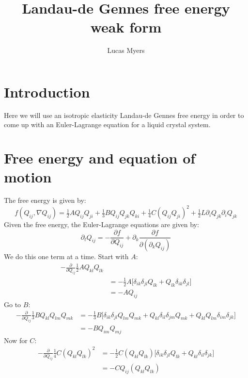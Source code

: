 \documentclass[reqno]{article}
\begin{document}
	\title{Landau-de Gennes free energy weak form}
	\author{Lucas Myers}
	\maketitle
	
	\section{Introduction}
	Here we will use an isotropic elasticity Landau-de Gennes free energy in order to come up with an Euler-Lagrange equation for a liquid crystal system.
	
	\section{Free energy and equation of motion}
	The free energy is given by:
	\begin{equation}
		f(Q_{ij}, \nabla Q_{ij})
		= \tfrac12 A Q_{ij} Q_{ji}
		+ \tfrac13 B Q_{ij} Q_{jk} Q_{ki}
		+ \tfrac14 C (Q_{ij} Q_{ji})^2
		+ \tfrac12 L \partial_i Q_{jk} \partial_i Q_{jk}
	\end{equation}
	Given the free energy, the Euler-Lagrange equations are given by:
	\begin{equation}
		\partial_t Q_{ij}
		= - \frac{\partial f}{\partial Q_{ij}}
		+ \partial_k \frac{\partial f}{\partial (\partial_k Q_{ij})}
	\end{equation}
	We do this one term at a time.
	Start with $A$:
	\begin{equation}
	\begin{split}
		-\frac{\partial}{\partial Q_{ij}}
		\tfrac12 A Q_{kl} Q_{lk} \\
		&= -\tfrac12 A \bigl[ 
		\delta_{ik} \delta_{jl} Q_{lk}
		+ Q_{lk} \delta_{ik} \delta_{jl}
		\bigr] \\
		&= -A Q_{ij}
	\end{split}
	\end{equation}
	Go to $B$:
	\begin{equation}
	\begin{split}
		-\frac{\partial}{\partial Q_{ij}}
		\tfrac13 B Q_{kl} Q_{lm} Q_{mk}
		&= -\tfrac13 B \bigl[ 
		\delta_{ik} \delta_{jl} Q_{lm} Q_{mk}
		+ Q_{kl} \delta_{il} \delta_{jm} Q_{mk}
		+ Q_{kl} Q_{lm} \delta_{im} \delta_{jk}
		\bigr] \\
		&= -B Q_{im} Q_{mj}
	\end{split}
	\end{equation}
	Now for $C$:
	\begin{equation}
	\begin{split}
		-\frac{\partial}{\partial Q_{ij}}
		\tfrac14 C (Q_{kl} Q_{lk})^2
		&= -\tfrac12 C (Q_{kl} Q_{lk})
		\bigl[
		\delta_{ik} \delta_{jl} Q_{lk}
		+ Q_{kl} \delta_{il} \delta_{jk}
		\bigr] \\
		&= -C Q_{ij} (Q_{kl} Q_{lk})
	\end{split}
	\end{equation}
\end{document}
